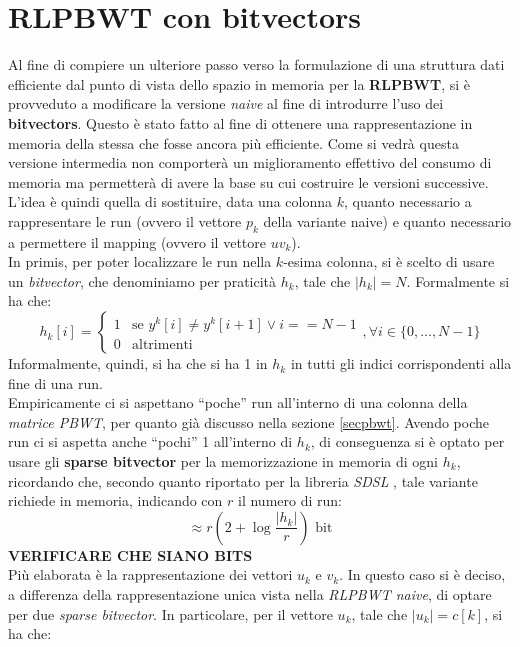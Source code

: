 \section{RLPBWT con bitvectors}
\label{secrlpbwtbv}
Al fine di compiere un ulteriore passo verso la formulazione di una struttura
dati efficiente dal punto di vista dello spazio in memoria per la
\textbf{RLPBWT}, si è provveduto a modificare la versione \textit{naive} al fine
di introdurre l'uso dei \textbf{bitvectors}. Questo è stato fatto al fine di
ottenere una rappresentazione in memoria della stessa che fosse ancora più
efficiente. Come si vedrà questa versione intermedia non comporterà un
miglioramento effettivo del consumo di memoria ma permetterà di avere la base su
cui costruire le versioni successive.\\
L'idea è quindi quella di sostituire, data una colonna $k$, quanto necessario a
rappresentare le run (ovvero il vettore $p_k$ della variante naive) e quanto
necessario a permettere il mapping (ovvero il vettore $uv_k$).\\
In primis, per poter localizzare le run nella $k$-esima colonna, si è scelto di
usare un \textit{bitvector}, che denominiamo per praticità $h_k$, tale che
$|h_k|=N$. Formalmente si ha che:
\[h_k[i]=
  \begin{cases}
    1&\mbox{se } y^k[i]\neq y^k[i+1]\lor i==N-1\\
    0&\mbox{altrimenti}
  \end{cases},\forall i\in \{0,\ldots,N-1\}
\]
Informalmente, quindi, si ha che si ha 1 in $h_k$ in tutti gli indici
corrispondenti alla fine di una run.\\
Empiricamente ci si aspettano ``poche'' run all'interno di una colonna della
\textit{matrice PBWT}, per quanto già discusso nella sezione
\ref{secpbwt}. Avendo poche run ci si aspetta anche ``pochi'' 1 all'interno di
$h_k$, di conseguenza si è optato per usare gli \textbf{sparse bitvector} per la
memorizzazione in memoria di ogni $h_k$, ricordando che, secondo quanto
riportato per la libreria \textit{SDSL} \cite{sdsl}, tale variante richiede in
memoria, indicando con $r$ il numero di run:
\[\approx r\left(2+\log\frac{|h_k|}{r}\right)\mbox{ bit}\]
\textbf{VERIFICARE CHE SIANO BITS}\\
Più elaborata è la rappresentazione dei vettori $u_k$ e $v_k$. In questo caso si
è deciso, a differenza della rappresentazione unica vista nella \textit{RLPBWT
  naive}, di optare per due \textit{sparse bitvector}. In particolare, per il
vettore $u_k$, tale che $|u_k|=c[k]$, si ha che:
